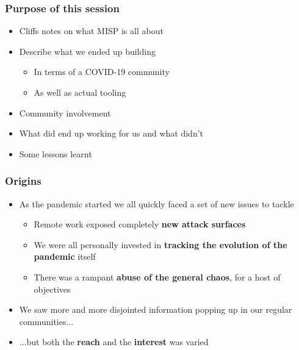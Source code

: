 
\begin{frame}[t,plain]
\titlepage
\end{frame}

\begin{frame}
 \frametitle{Purpose of this session}
 \begin{itemize}
         \item Cliffs notes on what MISP is all about
         \item Describe what we ended up building
         \begin{itemize}
              \item In terms of a COVID-19 community
              \item As well as actual tooling
         \end{itemize}
         \item Community involvement
         \item What did end up working for us and what didn't
         \item Some lessons learnt
 \end{itemize}
\end{frame}

\begin{frame}
 \frametitle{Origins}
 \begin{itemize}
         \item As the pandemic started we all quickly faced a set of new issues to tackle
         \begin{itemize}
              \item Remote work exposed completely {\bf new attack surfaces}
              \item We were all personally invested in {\bf tracking the evolution of the pandemic} itself
              \item There was a rampant {\bf abuse of the general chaos}, for a host of objectives
         \end{itemize}
         \item We saw more and more disjointed information popping up in our regular communities...
         \item ...but both the {\bf reach} and the {\bf interest} was varied
 \end{itemize}
\end{frame}

